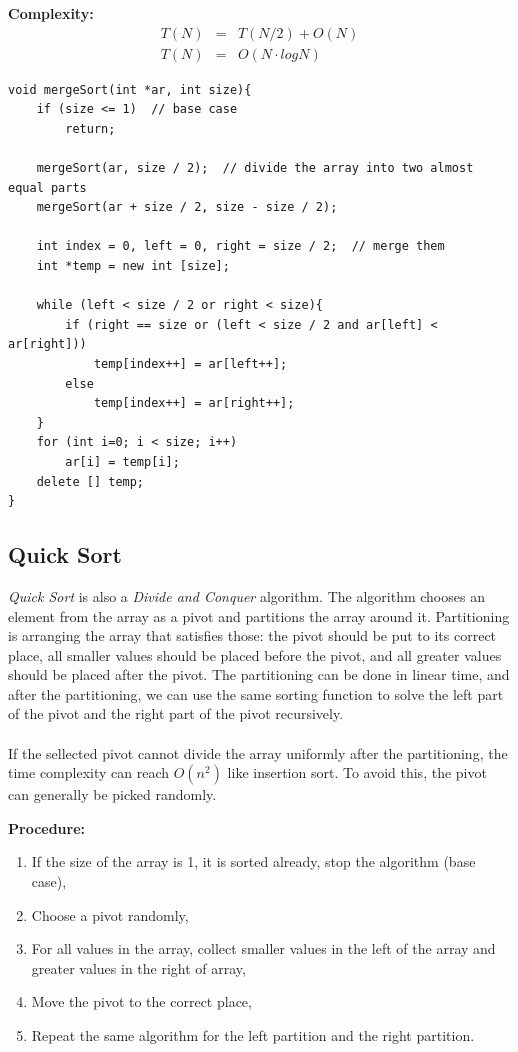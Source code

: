 \documentclass[12pt]{article}
\begin{document}
\textbf{Complexity: }
\begin{eqnarray*}
	T(N) &=& T(N / 2) + O(N) \\
	T(N) &=& O(N \cdot logN)
\end{eqnarray*}

\begin{verbatim}
void mergeSort(int *ar, int size){
    if (size <= 1)  // base case
        return;
	
    mergeSort(ar, size / 2);  // divide the array into two almost equal parts
    mergeSort(ar + size / 2, size - size / 2);
	
    int index = 0, left = 0, right = size / 2;  // merge them 
    int *temp = new int [size];
	
    while (left < size / 2 or right < size){
        if (right == size or (left < size / 2 and ar[left] < ar[right]))
            temp[index++] = ar[left++];
        else 
            temp[index++] = ar[right++];
    }
    for (int i=0; i < size; i++)
        ar[i] = temp[i];
    delete [] temp;
}		
\end{verbatim}

\cleardoublepage

		\subsection{Quick Sort}
		
\textit{Quick Sort} is also a \textit{Divide and Conquer} algorithm. The algorithm chooses an element from the array as a pivot and partitions the array around it. Partitioning is arranging the array that satisfies those: the pivot should be put to its correct place, all smaller values should be placed before the pivot, and all greater values should be placed after the pivot. The partitioning can be done in linear time, and after the partitioning, we can use the same sorting function to solve the left part of the pivot and the right part of the pivot recursively. \\ \\
If the sellected pivot cannot divide the array uniformly after the partitioning, the time complexity can reach $O(n ^ 2)$ like insertion sort. To avoid this, the pivot can generally be picked randomly.

\textbf{Procedure: }
\begin{enumerate}
	\item If the size of the array is 1, it is sorted already, stop the algorithm (base case),
	\item Choose a pivot randomly,
	\item For all values in the array, collect smaller values in the left of the array and greater values in the right of array,
	\item Move the pivot to the correct place,
	\item Repeat the same algorithm for the left partition and the right partition.
\end{enumerate}	
\end{document}
